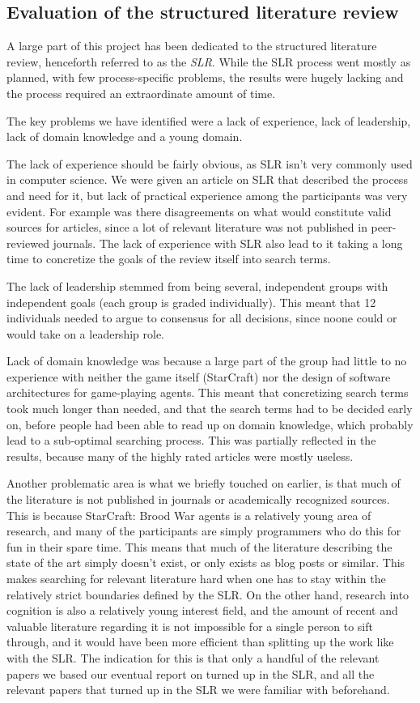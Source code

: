 \subsection{Evaluation of the structured literature review}
A large part of this project has been dedicated to the structured literature
review, henceforth referred to as the \textit{SLR}. While the SLR process went
mostly as planned, with few process-specific problems, the results were hugely
lacking and the process required an extraordinate amount of time.

The key problems we have identified were a lack of experience, lack of
leadership, lack of domain knowledge and a young domain.

The lack of experience should be fairly obvious, as SLR isn't very commonly
used in computer science. We were given an article on SLR that described the
process and need for it, but lack of practical experience among the
participants was very evident. For example was there disagreements on what
would constitute valid sources for articles, since a lot of relevant literature
was not published in peer-reviewed journals. The lack of
experience with SLR also lead to it taking a long time to concretize the goals
of the review itself into search terms.

The lack of leadership stemmed from being several, independent groups with
independent goals (each group is graded individually). This meant that 12
individuals needed to argue to consensus for all decisions, since noone could
or would take on a leadership role.

Lack of domain knowledge was because a large part of the group had little to no
experience with neither the game itself (StarCraft) nor the design of software
architectures for game-playing agents. This meant that concretizing search
terms took much longer than needed, and that the search terms had to be
decided early on, before people had been able to read up on domain knowledge,
which probably lead to a sub-optimal searching process. This was partially
reflected in the results, because many of the highly rated articles were mostly
useless.

Another problematic area is what we briefly touched on earlier, is that much of
the literature is not published in journals or academically recognized sources.
This is because StarCraft: Brood War agents is a relatively young area of
research, and many of the participants are simply programmers who do this for
fun in their spare time. This means that much of the literature describing the
state of the art simply doesn't exist, or only exists as blog posts or similar.
This makes searching for relevant literature hard when one has to stay within
the relatively strict boundaries defined by the SLR. On the other hand,
research into cognition is also a relatively young interest field, and the
amount of recent and valuable literature regarding it is not impossible for a
single person to sift through, and it would have been more efficient than
splitting up the work like with the SLR. The indication for this is that only a
handful of the relevant papers we based our eventual report on turned up in the
SLR, and all the relevant papers that turned up in the SLR we were familiar
with beforehand.


